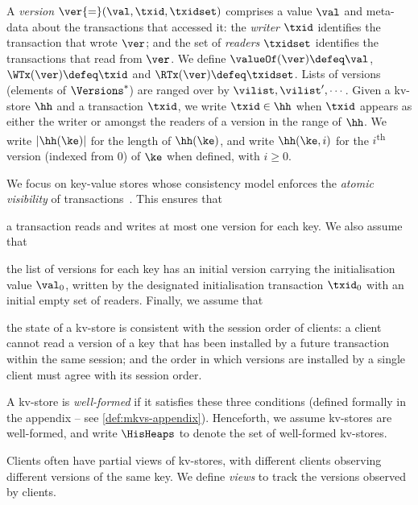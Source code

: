 A \emph{version} $\ver {=} (\val, \txid, \txidset)$ comprises  a value $\val$
and meta-data about the transactions that accessed it: the \emph{writer} $\txid$ identifies the transaction that wrote $\ver$;
and the set of \emph{readers} $\txidset$ identifies  the  transactions
that read from  $\ver$.
We define $\valueOf(\ver) \defeq \val$,
$\WTx(\ver) \defeq \txid$ and $\RTx(\ver) \defeq \txidset$. 
Lists of versions (elements of $\Versions^{\ast}$) are ranged over by $\vilist, \vilist',\cdots$.
Given a kv-store $\hh$ and a transaction $\txid$, we write 
$\txid \in \hh$ when $\txid$ appears as either the writer or amongst the readers of a version in the range of $\hh$.
We write  $\lvert \hh(\ke) \rvert$ for the length of $\hh(\ke)$, 
and write $\hh(\ke, i)$ for the $i$\textsuperscript{th} version (indexed from 0) of $\ke$ when defined, with $i \geq 0$.


We focus on key-value stores whose consistency model enforces the \emph{atomic visibility} of transactions~\cite{framework-concur}. 
This ensures that 
\begin{enumerate*}
	\item a transaction reads and writes at most one version for each key.
We also assume that 
	\item the list of versions for each key has an initial version 
carrying the initialisation value $\val_0$,  written by the designated initialisation transaction $\txid_0$ 
with an initial empty set of readers.
Finally, we assume that 
	\item the state of a kv-store is consistent with 
the session order of clients: a client cannot read a version of a key that has 
been installed by a future transaction within the same session;  and 
the order in which versions are installed by a single client must agree 
with its session order. 
\end{enumerate*}
A kv-store is \emph{well-formed} if it satisfies these three conditions (defined formally in the appendix -- see \cref{def:mkvs-appendix}). 
Henceforth, we assume kv-stores are well-formed, and write  $\HisHeaps$ to denote 
the set of well-formed kv-stores.

Clients often have partial views of kv-stores, 
with different clients observing 
different versions of the same key.
We define \emph{views} to track the versions observed by clients. 

